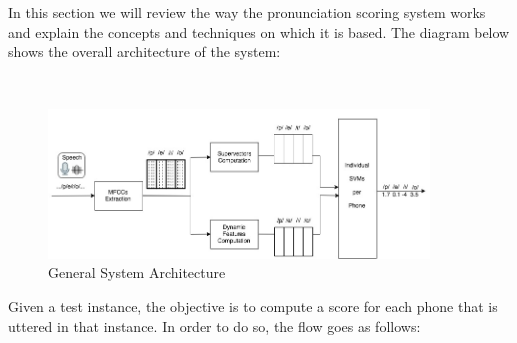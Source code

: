 In this section we will review the way the pronunciation scoring system works
and explain the concepts and techniques on which it is based. The diagram below
shows the overall architecture of the system:

~

\begin{figure}[H]
	\centering
	\includegraphics[width=0.9\textwidth]{files/figures/method/general-structure-v2.jpg}
	\caption{General System Architecture}
	\label{fig:methodGeneralArchitecture}
\end{figure}

Given a test instance, the objective is to compute a score for each phone that
is uttered in that instance. In order to do so, the flow goes as follows:

